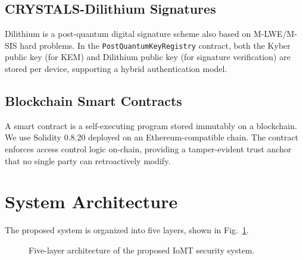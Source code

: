 \documentclass[conference]{IEEEtran}
\begin{document}
\subsection{CRYSTALS-Dilithium Signatures}
Dilithium \cite{nist_pqc} is a post-quantum digital signature scheme also based on
M-LWE/M-SIS hard problems. In the \texttt{PostQuantumKeyRegistry} contract, both the
Kyber public key (for KEM) and Dilithium public key (for signature verification) are
stored per device, supporting a hybrid authentication model.

\subsection{Blockchain Smart Contracts}
A smart contract is a self-executing program stored immutably on a blockchain. We use
Solidity 0.8.20 deployed on an Ethereum-compatible chain. The contract enforces access
control logic on-chain, providing a tamper-evident trust anchor that no single party
can retroactively modify.

\section{System Architecture}
\label{sec:architecture}

The proposed system is organized into five layers, shown in Fig.~\ref{fig:arch}.

\begin{figure}[!t]
\centering
{}
\caption{Five-layer architecture of the proposed IoMT security system.}
\label{fig:arch}
\end{figure}
\end{document}
